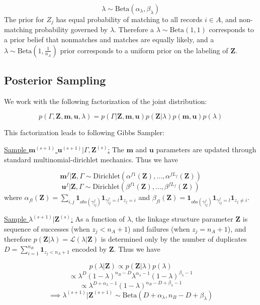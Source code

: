 \documentclass[
  12pt,
]{article}
\begin{document}
\[\lambda \sim \text{Beta}(\alpha_{\lambda}, \beta_{\lambda}) \] The
prior for \(Z_j\) has equal probability of matching to all records
\(i\in A\), and non-matching probability governed by \(\lambda\).
Therefore a \(\lambda \sim \text{Beta}(1, 1)\) corresponds to a prior
belief that nonmatches and matches are equally likely, and a
\(\lambda \sim \text{Beta}(1, \frac{1}{n_A})\) prior corresponds to a
uniform prior on the labeling of \(\mathbf{Z}\).

\hypertarget{posterior-sampling}{%
\subsection{Posterior Sampling}\label{posterior-sampling}}

We work with the following factorization of the joint distribution:

\[p(\Gamma, \mathbf{Z}, \mathbf{m}, \mathbf{u}, \lambda) = p(\Gamma|\mathbf{Z}, \mathbf{m}, \mathbf{u}) p(\mathbf{Z} | \lambda) p(\mathbf{m}, \mathbf{u}) p(\lambda)\]

This factorization leads to following Gibbs Sampler:

\underline{Sample $\mathbf{m}^{(s+1)}$ $\mathbf{u}^{(s+1)}|\Gamma, \mathbf{Z}^{(s)}$:}
The \(\mathbf{m}\) and \(\mathbf{u}\) parameters are updated through
standard multinomial-dirichlet mechanics. Thus we have

\[\mathbf{m}^f|\mathbf{Z}, \Gamma \sim \text{Dirichlet}(\alpha^{f1}(\mathbf{Z}), \ldots, \alpha^{fL_f}(\mathbf{Z}))\]
\[\mathbf{u}^f|\mathbf{Z}, \Gamma \sim \text{Dirichlet}(\beta^{f1}(\mathbf{Z}), \ldots, \beta^{fL_f}(\mathbf{Z}))\]
where
\(\alpha_{fl}(\mathbf{Z})= \sum_{i,j} \mathbf{1}_{obs(\gamma_{ij}^f)}\mathbf{1}_{\gamma_{ij}^f = l} \mathbf{1}_{z_j = i}\)
and
\(\beta_{fl}(\mathbf{Z})= \mathbf{1}_{obs(\gamma_{ij}^f)}\mathbf{1}_{\gamma_{ij}^f = l} \mathbf{1}_{z_j \neq i}\).

\underline{Sample $\lambda^{(s+1)}|\mathbf{Z}^{(s)}$:} As a function of
\(\lambda\), the linkage structure parameter \(\mathbf{Z}\) is sequence
of successes (when \(z_j < n_A + 1\)) and failures (when
\(z_j = n_A + 1\)), and therefore
\(p(\mathbf{Z}|\lambda) = \mathcal{L}(\lambda|\mathbf{Z})\) is
determined only by the number of duplicates
\(D = \sum_{i=1}^{n_B}\mathbf{1}_{z_j < n_A + 1}\) encoded by
\(\mathbf{Z}\). Thus we have

\[p(\lambda | \mathbf{Z}) \propto p(\mathbf{Z}|\lambda)p(\lambda)\]
\[\propto \lambda^D (1-\lambda)^{n_B - D} \lambda^{\alpha_{\lambda} -1} (1-\lambda)^{\beta_{\lambda} -1}\]
\[ \propto \lambda^{D + \alpha_{\lambda} - 1} (1-\lambda)^{n_B - D + \beta_{\lambda} -1}\]
\[\implies \lambda^{(s+1)}|\mathbf{Z}^{(s+1)} \sim \text{Beta}(D + \alpha_{\lambda}, n_B - D + \beta_{\lambda})\]
\end{document}
